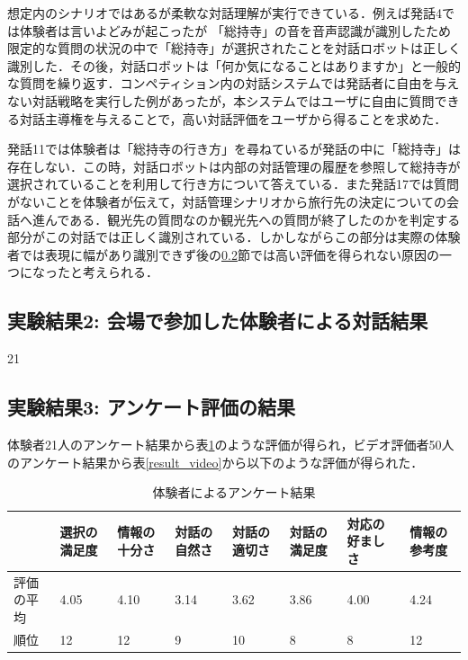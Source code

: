 想定内のシナリオではあるが柔軟な対話理解が実行できている．例えば発話4では体験者は言いよどみが起こったが
「総持寺」の音を音声認識が識別したため限定的な質問の状況の中で「総持寺」が選択されたことを対話ロボットは正しく識別した．その後，対話ロボットは「何か気になることはありますか」と一般的な質問を繰り返す．コンペティション内の対話システムでは発話者に自由を与えない対話戦略を実行した例があったが，本システムではユーザに自由に質問できる対話主導権を与えることで，高い対話評価をユーザから得ることを求めた．

発話11では体験者は「総持寺の行き方」を尋ねているが発話の中に「総持寺」は存在しない．この時，対話ロボットは内部の対話管理の履歴を参照して総持寺が選択されていることを利用して行き方について答えている．また発話17では質問がないことを体験者が伝えて，対話管理シナリオから旅行先の決定についての会話へ進んである．観光先の質問なのか観光先への質問が終了したのかを判定する部分がこの対話では正しく識別されている．しかしながらこの部分は実際の体験者では表現に幅があり識別できず後の\ref{アンケート評価}節では高い評価を得られない原因の一つになったと考えられる．

\subsection{実験結果2: 会場で参加した体験者による対話結果}
21

\subsection{実験結果3: アンケート評価の結果}
\label{アンケート評価}
体験者21人のアンケート結果から表\ref{result_taiken}のような評価が得られ，ビデオ評価者50人のアンケート結果から表\ref{result_video}から以下のような評価が得られた．

\begin{table}[hbtp]
    \caption{体験者によるアンケート結果}
    \label{result_taiken}
    \centering
    \begin{tabular}{l|l|l|l|l|l|l|l}
    \hline
          & 選択の満足度 & 情報の十分さ & 対話の自然さ & 対話の適切さ & 対話の満足度 & 対応の好ましさ & 情報の参考度 \\ \hline
    評価の平均 & 4.05   & 4.10   & 3.14   & 3.62   & 3.86   & 4.00    & 4.24   \\ \hline
    順位    & 12     & 12     & 9      & 10     & 8      & 8       & 12     \\ \hline
    \end{tabular}
\end{table}

